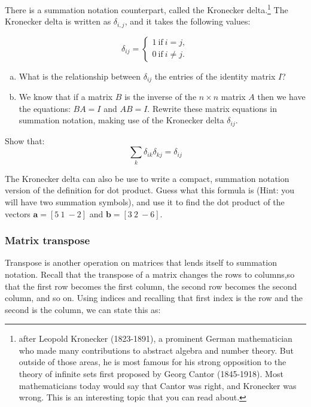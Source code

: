 There is a summation notation counterpart, called the {\bfi Kronecker delta}.\footnote{after Leopold Kronecker (1823-1891), a prominent German mathematician who made many contributions to abstract algebra and number theory. But outside of those areas, he is most famous for his strong opposition to the theory of infinite sets first proposed by Georg Cantor (1845-1918).  Most mathematicians today would say that Cantor was right, and Kronecker was wrong. This is an interesting topic that you can read about.} The Kronecker delta is written as $\delta_{i,j}$, and it takes the following values:

\[ \delta_{ij}=
\begin{cases}
1 ~ \text{if} ~ i=j,  \\
0 ~ \text{if} ~ i \neq j.
\end{cases} \]

\begin{exercise}{}
\begin{enumerate}[(a)]
\item
What is the relationship between $\delta_{ij}$ the entries of the identity matrix $I$?
\item
We know that if a matrix $B$ is the inverse of the $n \times n$ matrix $A$ then we have the equations: $BA = I$ and $AB = I$.  Rewrite these matrix equations in summation notation, making use of the Kronecker delta $\delta_{ij}$.
\end{enumerate}
\end{exercise}

\begin{exercise}{}
Show that:
\[ \sum_k  \delta_{ik}\delta_{kj}=\delta_{ij}\]
\end{exercise}

\begin{exercise}{}
The Kronecker delta can also be use to write a compact, summation notation version of the definition for dot product.  Guess what this formula is (Hint: you will have two summation symbols), and use it to find the dot product of the vectors $\textbf{a}=[5~1~-2]$ and $\textbf{b}=[3~2~-6]$.
\end{exercise}

\subsubsection*{Matrix transpose}
Transpose is another operation on matrices that lends itself to summation notation.  Recall that the transpose of a matrix changes the rows to columns,so that the first row becomes the first column, the second row becomes the second column, and so on.   Using indices and recalling that first index is the row and the second is the column, we can state this as:


